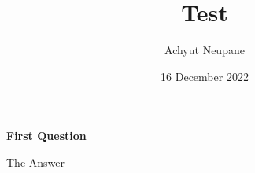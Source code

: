 \documentclass{SunwayCoverPage}
\title{Test}
\date{16 December 2022}
\author{Achyut Neupane}
\begin{document}
\maketitle

\begin{questions}
    \question \textbf{First Question}
    \begin{TheSolution}
        The Answer
    \end{TheSolution}

\end{questions}
\end{document}
